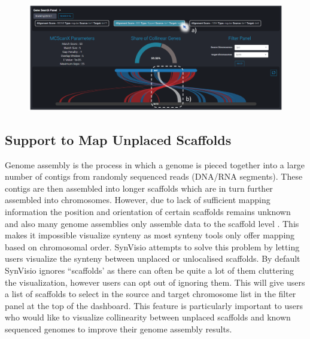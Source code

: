 \begin{figure}
  \centering
  \includegraphics[width=1\linewidth]{images/ch_5_gene_serach.PNG}
  \label{fig:ch_5_gene_serach}
\end{figure}


\subsection{Support to Map Unplaced Scaffolds}
Genome assembly is the process in which a genome is pieced together into a large number of contigs from randomly sequenced reads (DNA/RNA segments)\cite{hunt2014comprehensive}. These contigs are then assembled into longer scaffolds which are in turn further assembled into chromosomes. However, due to lack of sufficient mapping information the position and orientation of certain scaffolds remains unknown and also many genome assemblies only assemble data to the scaffold level \cite{ensembl}. This makes it impossible visualize synteny as most synteny tools only offer mapping based on chromosomal order. SynVisio attempts to solve this problem by letting users visualize the synteny between unplaced or unlocalised scaffolds. By default SynVisio ignores ``scaffolds' as there can often be quite a lot of them cluttering the visualization, however users can opt out of ignoring them. This will give users a list of scaffolds to select in the source and target chromosome list in the filter panel at the top of the dashboard. This feature is particularly important to users who would like to visualize collinearity between unplaced scaffolds and known sequenced genomes to improve their genome assembly results. 


